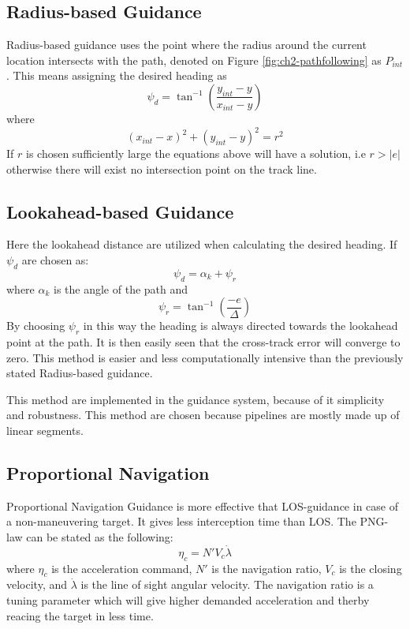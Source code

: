 	\subsection{Radius-based Guidance}
		Radius-based guidance uses the point where the radius around the current location intersects
		with the path, denoted on Figure \ref{fig:ch2-pathfollowing} as $P_{int}$. This
		means assigning the desired heading as 
		\begin{equation}
			\psi_d = \tan^{-1}(\frac{y_{int} - y}{x_{int} - y})
		\end{equation}
		where 
		\begin{equation}
			(x_{int} - x)^2 + (y_{int} - y)^2 = r^2
		\end{equation}
		If $r$ is chosen sufficiently large the equations above will have a solution, i.e $r > |e|$
		otherwise there will exist no intersection point on the track line.
		\cite{guidance_planar_path}
	
	\subsection{Lookahead-based Guidance}
		Here the lookahead distance are utilized when calculating the desired heading. If $\psi_d$ are
		chosen as:
		\begin{equation}
			\psi_d = \alpha_k + \psi_r
		\end{equation}
		where $\alpha_k$ is the angle of the path and
		\begin{equation}
			\psi_r = \tan^{-1} (\frac{-e}{\Delta})
		\end{equation}
		By choosing $\psi_r$ in this way the heading is always directed towards the lookahead point at
		the path. It is then easily seen that the cross-track error will converge to zero. This
		method is easier and less computationally intensive than the previously stated Radius-based
		guidance. \cite{guidance_planar_path}

		This method are implemented in the guidance system, because of it simplicity and robustness.
		This method are chosen because pipelines are mostly made up of linear segments. 

	
	\subsection{Proportional Navigation}
		Proportional Navigation Guidance is more effective that LOS-guidance in case of a
		non-maneuvering
		target. It gives less interception time than LOS. The PNG-law can be stated as the following:
		\cite{GuidanceReview}
		\begin{equation}
			\eta_c = N' V_c \dot{\lambda}
		\end{equation}
		where $\eta_c$ is the acceleration command, $N'$ is the navigation ratio, $V_c$ is the closing
		velocity, and $\dot{\lambda}$ is the line of sight angular velocity. The navigation ratio is a
		tuning
		parameter which will give higher demanded acceleration and therby reacing the target in less
		time.

